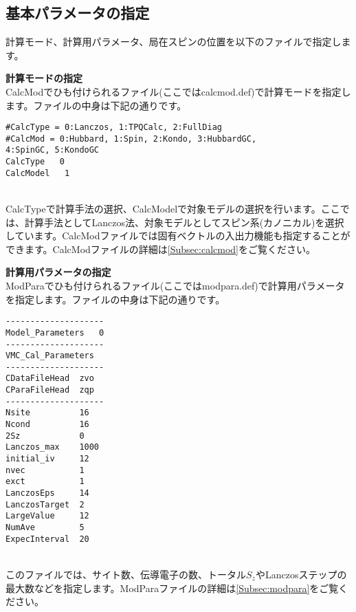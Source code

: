 \subsection{基本パラメータの指定}
計算モード、計算用パラメータ、局在スピンの位置を以下のファイルで指定します。
\begin{description}
\item {\bf 計算モードの指定}\\
CalcModでひも付けられるファイル(ここではcalcmod.def)で計算モードを指定します。ファイルの中身は下記の通りです。\\
\begin{minipage}{15cm}
\begin{screen}
\begin{verbatim}
#CalcType = 0:Lanczos, 1:TPQCalc, 2:FullDiag
#CalcMod = 0:Hubbard, 1:Spin, 2:Kondo, 3:HubbardGC, 
4:SpinGC, 5:KondoGC 
CalcType   0
CalcModel   1
\end{verbatim}
\end{screen}
\end{minipage}
~\\
CalcTypeで計算手法の選択、CalcModelで対象モデルの選択を行います。ここでは、計算手法としてLanczos法、対象モデルとしてスピン系(カノニカル)を選択しています。{CalcModファイルでは固有ベクトルの入出力機能も指定することができます。}CalcModファイルの詳細は\ref{Subsec:calcmod}をご覧ください。\\

\item {\bf 計算用パラメータの指定}\\
ModParaでひも付けられるファイル(ここではmodpara.def)で計算用パラメータを指定します。ファイルの中身は下記の通りです。\\
\begin{minipage}{15cm}
\begin{screen}
\begin{verbatim}
--------------------
Model_Parameters   0
--------------------
VMC_Cal_Parameters
--------------------
CDataFileHead  zvo
CParaFileHead  zqp
--------------------
Nsite          16   
Ncond          16    
2Sz            0    
Lanczos_max    1000 
initial_iv     12   
nvec           1    
exct           1    
LanczosEps     14   
LanczosTarget  2    
LargeValue     12   
NumAve         5    
ExpecInterval  20 
\end{verbatim}
\end{screen}
\end{minipage}
~\\
このファイルでは、サイト数、{伝導電子の数、トータル$S_z$}やLanczosステップの最大数などを指定します。ModParaファイルの詳細は\ref{Subsec:modpara}をご覧ください。\\


\end{description}
